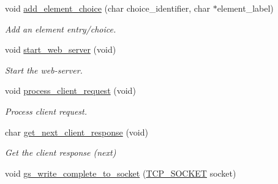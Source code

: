 \begin{DoxyCompactItemize}
void \hyperlink{group__wireless__interface_ga9232914e10eaf554254e01125de8bea5}{add\+\_\+element\+\_\+choice} (char choice\+\_\+identifier, char $\ast$element\+\_\+label)
\begin{DoxyCompactList}\small\item\em Add an element entry/choice. \end{DoxyCompactList}\item 
void \hyperlink{group__wireless__interface_ga199824a067b165e6f58d54f4deba7cf5}{start\+\_\+web\+\_\+server} (void)
\begin{DoxyCompactList}\small\item\em Start the web-\/server. \end{DoxyCompactList}\item 
void \hyperlink{group__wireless__interface_gae035353439173124e040f4f2e1a870fe}{process\+\_\+client\+\_\+request} (void)
\begin{DoxyCompactList}\small\item\em Process client request. \end{DoxyCompactList}\item 
char \hyperlink{group__wireless__interface_ga2100585c30b1024f988075494c0a7b88}{get\+\_\+next\+\_\+client\+\_\+response} (void)
\begin{DoxyCompactList}\small\item\em Get the client response (next) \end{DoxyCompactList}\item 
void \hyperlink{group__wireless__interface_ga14c6fc8c97a0d85dcddf40f93e27fb84}{gs\+\_\+write\+\_\+complete\+\_\+to\+\_\+socket} (\hyperlink{group__wireless__interface_gab2d7ad3f99c2b04b0f5f5a77eefc5355}{T\+C\+P\+\_\+\+S\+O\+C\+K\+ET} socket)
\end{DoxyCompactItemize}
